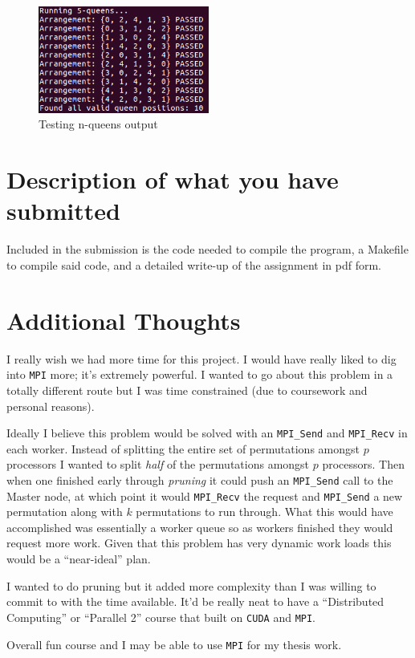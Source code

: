 \documentclass{article}
\begin{document}
\begin{figure}[h]
    \centering
    \includegraphics[width=0.5\textwidth]{console_output}
    \caption{Testing n-queens output}
    \label{fig:console}
\end{figure}

\section{Description of what you have submitted}
Included in the submission is the code needed to compile the program, a Makefile 
to compile said code, and a detailed write-up of the assignment in pdf form.

\section{Additional Thoughts}
I really wish we had more time for this project. I would have really liked to 
dig into \verb|MPI| more; it's extremely powerful. I wanted to go about this 
problem in a totally different route but I was time constrained (due to 
coursework and personal reasons). 

Ideally I believe this problem would be solved with an \verb|MPI_Send| and 
\verb|MPI_Recv| in each worker. Instead of splitting the entire set of 
permutations amongst $p$ processors I wanted to split \textit{half} of the 
permutations amongst $p$ processors. Then when one finished early through 
\textit{pruning} it could push an \verb|MPI_Send| call to the Master node, at 
which point it would \verb|MPI_Recv| the request and \verb|MPI_Send| a new 
permutation along with $k$ permutations to run through. What this would have 
accomplished was essentially a worker queue so as workers finished they would 
request more work. Given that this problem has very dynamic work loads this 
would be a ``near-ideal'' plan.

I wanted to do pruning but it added more complexity than I was willing to commit 
to with the time available. It'd be really neat to have a 
``Distributed Computing'' or ``Parallel 2'' course that built on \verb|CUDA| and 
\verb|MPI|.

Overall fun course and I may be able to use \verb|MPI| for my thesis work.
\end{document}
